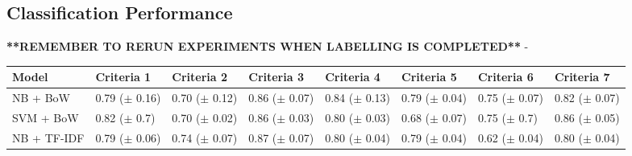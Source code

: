 \documentclass[a4paper,twoside,phd]{BYUPhys}
\begin{document}
\subsection{Classification Performance}
\textbf{**REMEMBER TO RERUN EXPERIMENTS WHEN LABELLING IS COMPLETED**}
- 
\begin{table}[H]
	\centering
	\begin{tabular}{|p{1.7cm}|p{1.6cm}|p{1.6cm}|p{1.6cm}|p{1.6cm}|p{1.6cm}|p{1.6cm}|p{1.6cm}|}
		\hline
		Model & Criteria 1                                                                           & Criteria 2    & Criteria 3 & Criteria 4 & Criteria 5 & Criteria 6 & Criteria 7                                                                                                                                                                                                                                                                                                                                                          \\
		\hline
		NB + BoW  & 0.79 \newline ($\pm$ 0.16) & 0.70 \newline ($\pm$ 0.12) & 0.86 \newline ($\pm$ 0.07) & 0.84 \newline ($\pm$ 0.13) & 0.79 \newline ($\pm$ 0.04)  & 0.75 \newline ($\pm$ 0.07)  & 0.82 \newline ($\pm$ 0.07)   \\
		\hline
		
		SVM + BoW  & 0.82 \newline ($\pm$ 0.7) & 0.70 \newline ($\pm$ 0.02) & 0.86 \newline ($\pm$ 0.03) & 0.80 \newline ($\pm$ 0.03) & 0.68 \newline ($\pm$ 0.07)  & 0.75 \newline ($\pm$ 0.7)  & 0.86 \newline ($\pm$ 0.05)                                                                                                                                             \\
		\hline                                                                                                                                                                                                                
				
		NB + TF-IDF  & 0.79 \newline ($\pm$ 0.06) & 0.74 \newline ($\pm$ 0.07) & 0.87 \newline ($\pm$ 0.07) & 0.80 \newline ($\pm$ 0.04) & 0.79 \newline ($\pm$ 0.04)  & 0.62 \newline ($\pm$ 0.04)  & 0.80 \newline ($\pm$ 0.04)  \\
		\hline
		

\end{tabular}
\end{table}
\end{document}
